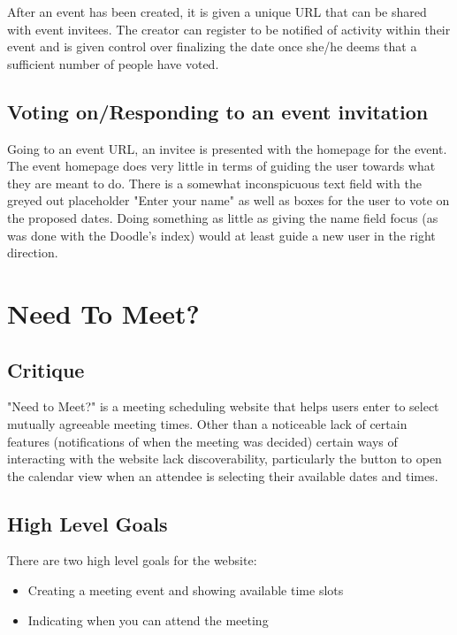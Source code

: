 \documentclass{sigchi}
\begin{document}
After an event has been created, it is given a unique URL that can
be shared with event invitees. The creator can register to be
notified of activity within their event and is given control over
finalizing the date once she/he deems that a sufficient number of
people have voted.

\subsection{Voting on/Responding to an event invitation}

Going to an event URL, an invitee is presented with the homepage for
the event. The event homepage does very little in terms of guiding
the user towards what they are meant to do. There is a somewhat
inconspicuous text field with the greyed out placeholder "Enter your
name" as well as boxes for the user to vote on the proposed
dates. Doing something as little as giving the name field focus (as
was done with the Doodle's index) would at least guide a new user in
the right direction.

\section{Need To Meet?}

\subsection{Critique}
"Need to Meet?" is a meeting scheduling website that helps users
enter to select mutually agreeable meeting times. Other than a noticeable 
lack of certain features (notifications of when the meeting was decided)
certain ways of interacting with the website lack discoverability, particularly
the button to open the calendar view when an attendee is selecting their available
dates and times.
\subsection{High Level Goals}
There are two high level goals for the website:
\begin{itemize}
	\item Creating a meeting event and showing available time slots
	\item Indicating when you can attend the meeting
\end{itemize}
\end{document}

